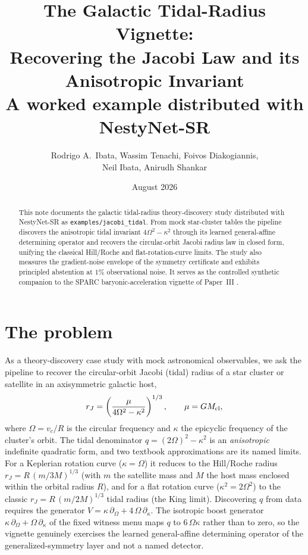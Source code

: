 \documentclass[11pt]{article}
\title{The Galactic Tidal-Radius Vignette:\\
Recovering the Jacobi Law and its Anisotropic Invariant\\
{\large A worked example distributed with NestyNet-SR}}
\author{Rodrigo A.\ Ibata, Wassim Tenachi, Foivos Diakogiannis,\\
Neil Ibata, Anirudh Shankar}
\date{August 2026}
\begin{document}
\maketitle

\begin{abstract}
\noindent
This note documents the galactic tidal-radius theory-discovery study
distributed with NestyNet-SR as \texttt{examples/jacobi\_tidal}.  From
mock star-cluster tables the pipeline discovers the anisotropic tidal
invariant $4\Omega^{2}-\kappa^{2}$ through its learned general-affine
determining operator and recovers the circular-orbit Jacobi radius law
in closed form, unifying the classical Hill/Roche and flat-rotation-curve
limits.  The study also measures the gradient-noise envelope of the
symmetry certificate and exhibits principled abstention at $1\%$
observational noise.  It serves as the controlled synthetic companion to
the SPARC baryonic-acceleration vignette of Paper~III
\citep{NestyNet2026b}.
\end{abstract}

\section{The problem}

As a theory-discovery case study with mock astronomical observables, we
ask the pipeline to recover the circular-orbit Jacobi (tidal) radius of a
star cluster or satellite in an axisymmetric galactic host,
%
\begin{equation}
r_J=\left(\frac{\mu}{4\Omega^{2}-\kappa^{2}}\right)^{1/3},
\qquad \mu = G M_{\rm cl},
\label{eq:jacobi-law}
\end{equation}
%
where $\Omega=v_c/R$ is the circular frequency and $\kappa$ the epicyclic
frequency of the cluster's orbit.  The tidal denominator
$q=(2\Omega)^{2}-\kappa^{2}$ is an \emph{anisotropic} indefinite quadratic
form, and two textbook approximations are its named limits.  For a
Keplerian rotation curve ($\kappa=\Omega$) it reduces to the Hill/Roche
radius $r_J=R\,(m/3M)^{1/3}$ (with $m$ the satellite mass and $M$ the
host mass enclosed within the orbital radius $R$), and for a flat
rotation curve ($\kappa^2=2\Omega^{2}$) to the classic
$r_J=R\,(m/2M)^{1/3}$ tidal radius (the King limit).  Discovering $q$
from data requires the generator
$V=\kappa\,\partial_\Omega+4\,\Omega\,\partial_\kappa$.  The isotropic
boost generator $\kappa\,\partial_\Omega+\Omega\,\partial_\kappa$ of the
fixed witness menu maps $q$ to $6\,\Omega\kappa$ rather than to zero, so
the vignette genuinely exercises the learned general-affine determining
operator of the generalized-symmetry layer \citep{NestyNet2026b} and not
a named detector.
\end{document}
